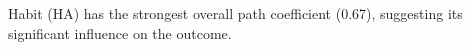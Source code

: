 Habit (HA) has the strongest overall path coefficient (0.67), suggesting its significant influence on the outcome.